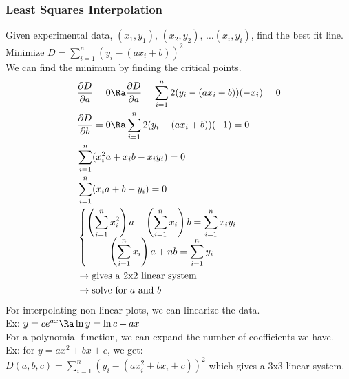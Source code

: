\subsubsection{Least Squares Interpolation}
Given experimental data, $(x_1,y_1),\,(x_2,y_2),\,\ldots(x_i,y_i)$, find the best fit line.\\
Minimize $D=\sum\limits_{i=1}^n(y_i-(ax_i+b))^2$\\
We can find the minimum by finding the critical points.\\
\begin{align*}
    &\frac{\partial D}{\partial a}=0\Ra\frac{\partial D}{\partial a}=\sum_{i=1}^n2(y_i-(ax_i+b))(-x_i)=0\\
    &\frac{\partial D}{\partial b}=0\Ra\sum_{i=1}^n2(y_i-(ax_i+b))(-1)=0\\
    &\sum_{i=1}^n(x_i^2a+x_ib-x_iy_i)=0\\
    &\sum_{i=1}^n(x_ia+b-y_i)=0\\
    &\left\{\begin{matrix}
    \displaystyle{\left(\sum_{i=1}^nx_i^2\right)a+\left(\sum_{i=1}^nx_i\right)b=\sum_{i=1}^nx_iy_i}\\
    \displaystyle{\left(\sum_{i=1}^nx_i\right)a+nb=\sum_{i=1}^ny_i}
    \end{matrix}\right.\\
    &\to\text{gives a 2x2 linear system}\\
    &\to\text{solve for $a$ and $b$}
\end{align*}
For interpolating non-linear plots, we can linearize the data.\\
Ex: $y=ce^{ax}\Ra\ln y=\ln c+ax$\\
For a polynomial function, we can expand the number of coefficients we have.\\
Ex: for $y=ax^2+bx+c$, we get:\\
$D(a,b,c)=\sum\limits_{i=1}^n(y_i-(ax_i^2+bx_i+c))^2$ which gives a 3x3 linear system.
